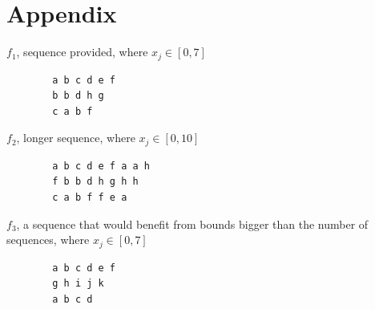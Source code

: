 \documentclass[conference]{IEEEtran}
\begin{document}
\section{Appendix}

$f_1$, sequence provided, where $x_j \in [0, 7]$
\begin{lstlisting}
        a b c d e f
        b b d h g
        c a b f
\end{lstlisting}

$f_2$, longer sequence, where $x_j \in [0, 10]$
\begin{lstlisting}
        a b c d e f a a h
        f b b d h g h h
        c a b f f e a
\end{lstlisting}

$f_3$, a sequence that would benefit from bounds bigger than the number of sequences, where $x_j \in [0, 7]$
\begin{lstlisting}
        a b c d e f
        g h i j k
        a b c d
\end{lstlisting}
\end{document}
